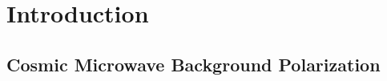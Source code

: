 \chapter{Introduction}
\label{intro_chapter}




\section{Cosmic Microwave Background Polarization}
\label{sec:cmb_science}


